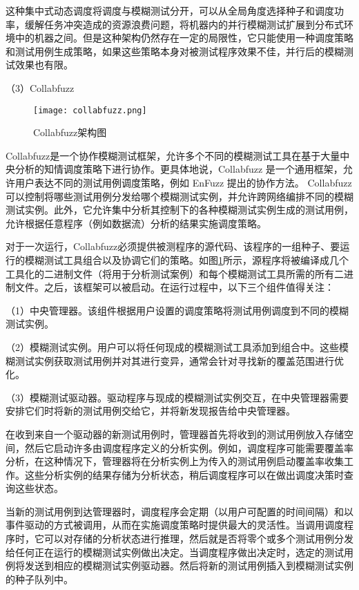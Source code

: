 \documentclass[master]{thesis-uestc}
\begin{document}
这种集中式动态调度将调度与模糊测试分开，可以从全局角度选择种子和调度功率，缓解任务冲突造成的资源浪费问题，将机器内的并行模糊测试扩展到分布式环境中的机器之间。但是这种架构仍然存在一定的局限性，它只能使用一种调度策略和测试用例生成策略，如果这些策略本身对被测试程序效果不佳，并行后的模糊测试效果也有限。

（3）Collabfuzz

\begin{figure}[!htbp]
    \vspace{6pt}
    \centering
    \texttt{[image: collabfuzz.png]}
    \caption{Collabfuzz架构图}
    \label{collabfuzz}
\end{figure}

Collabfuzz是一个协作模糊测试框架，允许多个不同的模糊测试工具在基于大量中央分析的知情调度策略下进行协作。更具体地说，Collabfuzz 是一个通用框架，允许用户表达不同的测试用例调度策略，例如 EnFuzz 提出的协作方法。 Collabfuzz 可以控制将哪些测试用例分发给哪个模糊测试实例，并允许跨网络编排不同的模糊测试实例。此外，它允许集中分析其控制下的各种模糊测试实例生成的测试用例，允许根据任意程序（例如数据流）分析的结果实施调度策略。

对于一次运行，Collabfuzz必须提供被测程序的源代码、该程序的一组种子、要运行的模糊测试工具组合以及协调它们的策略。如图\ref{collabfuzz}所示，源程序将被编译成几个工具化的二进制文件（将用于分析测试案例）和每个模糊测试工具所需的所有二进制文件。之后，该框架可以被启动。在运行过程中，以下三个组件值得关注：

（1）中央管理器。该组件根据用户设置的调度策略将测试用例调度到不同的模糊测试实例。

（2）模糊测试实例。用户可以将任何现成的模糊测试工具添加到组合中。这些模糊测试实例获取测试用例并对其进行变异，通常会针对寻找新的覆盖范围进行优化。 

（3）模糊测试驱动器。驱动程序与现成的模糊测试实例交互，在中央管理器需要安排它们时将新的测试用例交给它，并将新发现报告给中央管理器。

在收到来自一个驱动器的新测试用例时，管理器首先将收到的测试用例放入存储空间，然后它启动许多由调度程序定义的分析实例。例如，调度程序可能需要覆盖率分析，在这种情况下，管理器将在分析实例上为传入的测试用例启动覆盖率收集工作。这些分析实例的结果存储为分析状态，稍后调度程序可以在做出调度决策时查询这些状态。

当新的测试用例到达管理器时，调度程序会定期（以用户可配置的时间间隔）和以事件驱动的方式被调用，从而在实施调度策略时提供最大的灵活性。当调用调度程序时，它可以对存储的分析状态进行推理，然后就是否将零个或多个测试用例分发给任何正在运行的模糊测试实例做出决定。当调度程序做出决定时，选定的测试用例将发送到相应的模糊测试实例驱动器。然后将新的测试用例插入到模糊测试实例的种子队列中。
\end{document}

